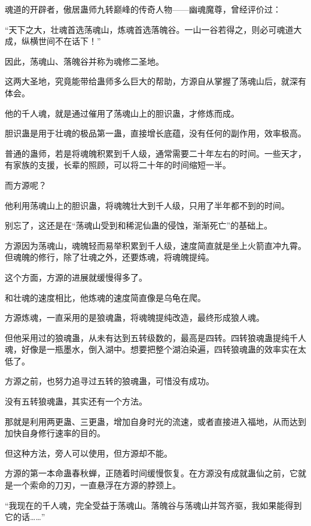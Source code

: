 
\begin{this_body}

魂道的开辟者，傲居蛊师九转巅峰的传奇人物——幽魂魔尊，曾经评价过：

“天下之大，壮魂首选荡魂山，炼魂首选落魄谷。一山一谷若得之，则必可魂道大成，纵横世间不在话下！”

因此，荡魂山、落魄谷并称为魂修二圣地。

这两大圣地，究竟能带给蛊师多么巨大的帮助，方源自从掌握了荡魂山后，就深有体会。

他的千人魂，就是通过催用了荡魂山上的胆识蛊，才修炼而成。

胆识蛊是用于壮魂的极品第一蛊，直接增长底蕴，没有任何的副作用，效率极高。

普通的蛊师，若是将魂魄积累到千人级，通常需要二十年左右的时间。一些天才，有家族的支援，长辈的照顾，可以将二十年的时间缩短一半。

而方源呢？

他利用荡魂山上的胆识蛊，将魂魄壮大到千人级，只用了半年都不到的时间。

别忘了，这还是在“荡魂山受到和稀泥仙蛊的侵蚀，渐渐死亡”的基础上。

方源因为荡魂山，魂魄轻而易举积累到千人级，速度简直就是坐上火箭直冲九霄。但魂魄的修行，除了壮魂之外，还要炼魂，将魂魄提纯。

这个方面，方源的进展就缓慢得多了。

和壮魂的速度相比，他炼魂的速度简直像是乌龟在爬。

方源炼魂，一直采用的是狼魂蛊，将魂魄提纯改造，最终形成狼人魂。

但他采用过的狼魂蛊，从未有达到五转级数的，最高是四转。四转狼魂蛊提纯千人魂，好像是一瓶墨水，倒入湖中。想要把整个湖泊染遍，四转狼魂蛊的效率实在太低了。

方源之前，也努力追寻过五转的狼魂蛊，可惜没有成功。

没有五转狼魂蛊，其实还有一个方法。

那就是利用两更蛊、三更蛊，增加自身时光的流速，或者直接进入福地，从而达到加快自身修行速率的目的。

但这种方法，旁人可以使用，但方源却不能。

方源的第一本命蛊春秋蝉，正随着时间缓慢恢复。在方源没有成就蛊仙之前，它就是一个索命的刀刃，一直悬浮在方源的脖颈上。

“我现在的千人魂，完全受益于荡魂山。落魄谷与荡魂山并驾齐驱，我如果能得到它的话……”


\end{this_body}
